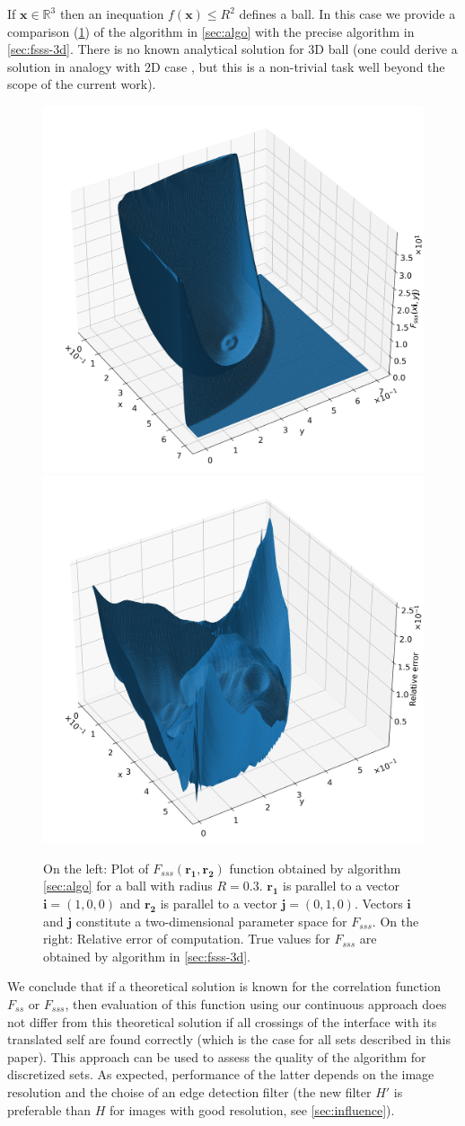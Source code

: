 \documentclass[preprint]{elsarticle}
\begin{document}
If $\bm{x} \in \mathbb{R}^3$ then an inequation $f(\bm{x}) \le R^2$ defines a
ball. In this case we provide a comparison (\cref{fig:fsss-ball}) of the
algorithm in \cref{sec:algo} with the precise algorithm in
\cref{sec:fsss-3d}. There is no known analytical solution for 3D ball (one could
derive a solution in analogy with 2D case \cite{Torquato_book}, but this is a
non-trivial task well beyond the scope of the current work).
\begin{figure}[!hpt]
  \centering
  \includegraphics[width=0.45\linewidth]{images/ball-sss.png}
  \hfill
  \includegraphics[width=0.45\linewidth]{images/ball-sss-error.png}
  \caption[]{On the left: Plot of $F_{sss}(\bm{r_1}, \bm{r_2})$ function
    obtained by algorithm \cref{sec:algo} for a ball with radius
    $R = 0.3$. $\bm{r_1}$ is parallel to a vector $\bm{i} = (1, 0, 0)$ and
    $\bm{r_2}$ is parallel to a vector $\bm{j} = (0, 1, 0)$. Vectors $\bm{i}$
    and $\bm{j}$ constitute a two-dimensional parameter space for $F_{sss}$. On
    the right: Relative error of computation. True values for $F_{sss}$ are
    obtained by algorithm in \cref{sec:fsss-3d}.}
  \label{fig:fsss-ball}
\end{figure}

We conclude that if a theoretical solution is known for the correlation function
$F_{ss}$ or $F_{sss}$, then evaluation of this function using our continuous
approach does not differ from this theoretical solution if all crossings of
the interface with its translated self are found correctly (which is the case
for all sets described in this paper). This approach can be used to assess the
quality of the algorithm for discretized sets. As expected, performance of the
latter depends on the image resolution and the choise of an edge detection
filter (the new filter $H'$ is preferable than $H$ for images with good
resolution, see \cref{sec:influence}).
\end{document}
